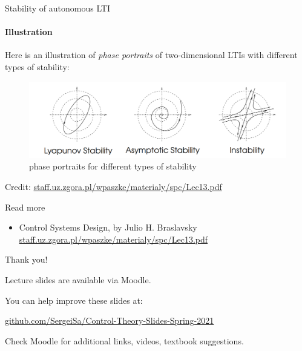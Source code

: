 \documentclass{beamer}
\begin{document}
\begin{frame}{Stability of autonomous LTI}
\framesubtitle{Illustration}
\begin{flushleft}

Here is an illustration of \emph{phase portraits} of two-dimensional LTIs with different types of stability:

\begin{figure}
    \centering
    \includegraphics[width=1.0\linewidth]{Stability.PNG}
    \caption{phase portraits for different types of stability}
    \label{fig:Stability}
\end{figure}

\bigskip

\scriptsize{Credit: \href{http://staff.uz.zgora.pl/wpaszke/materialy/spc/Lec13.pdf}{staff.uz.zgora.pl/wpaszke/materialy/spc/Lec13.pdf}}

\end{flushleft}
\end{frame}






\begin{frame}{Read more}

\begin{itemize}
\item Control Systems Design, by Julio H. Braslavsky \href{http://staff.uz.zgora.pl/wpaszke/materialy/spc/Lec13.pdf}{staff.uz.zgora.pl/wpaszke/materialy/spc/Lec13.pdf}


\end{itemize}

\end{frame}



\begin{frame}{Thank you!}
\centerline{Lecture slides are available via Moodle.}
\bigskip
\centerline{You can help improve these slides at:}
\centerline{\href{https://github.com/SergeiSa/Control-Theory-Slides-Spring-2021}{github.com/SergeiSa/Control-Theory-Slides-Spring-2021}}
\bigskip
\centerline{Check Moodle for additional links, videos, textbook suggestions.}
\end{frame}
\end{document}
